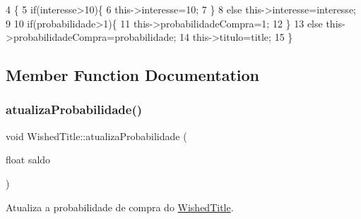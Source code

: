 \begin{DoxyCode}
4                                                                               \{
5     \textcolor{keywordflow}{if}(interesse>10)\{
6         this->interesse=10;
7     \}
8     \textcolor{keywordflow}{else} this->interesse=interesse;
9 
10     \textcolor{keywordflow}{if}(probabilidade>1)\{
11         this->probabilidadeCompra=1;
12     \}
13     \textcolor{keywordflow}{else} this->probabilidadeCompra=probabilidade;
14     this->titulo=title;
15 \}
\end{DoxyCode}


\subsection{Member Function Documentation}
\mbox{\label{classWishedTitle_a8be5446371add65ba4de2c69c84cb387}} 
\subsubsection{\texorpdfstring{atualiza\+Probabilidade()}{atualizaProbabilidade()}}
{\footnotesize\ttfamily void Wished\+Title\+::atualiza\+Probabilidade (\begin{DoxyParamCaption}\item[{float}]{saldo }\end{DoxyParamCaption})}



Atualiza a probabilidade de compra do \hyperlink{classWishedTitle}{Wished\+Title}. 


